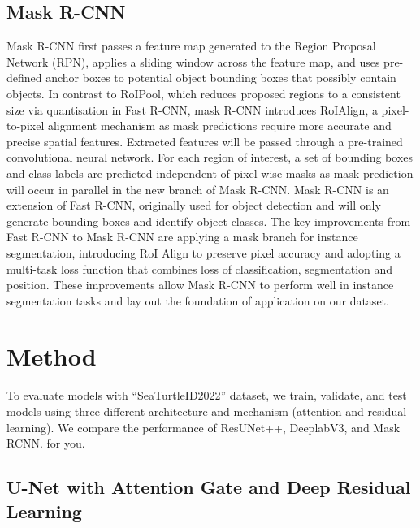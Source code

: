 \documentclass[conference]{IEEEtran}
\begin{document}
\subsection{Mask R-CNN}
Mask R-CNN first passes a feature map generated to the Region Proposal Network (RPN), applies a sliding window across the feature map, and uses pre-defined anchor boxes to potential object bounding boxes that possibly contain objects. In contrast to RoIPool, which reduces proposed regions to a consistent size via quantisation in Fast R-CNN, mask R-CNN introduces RoIAlign, a pixel-to-pixel alignment mechanism as mask predictions require more accurate and precise spatial features. Extracted features will be passed through a pre-trained convolutional neural network. For each region of interest, a set of bounding boxes and class labels are predicted independent of pixel-wise masks as mask prediction will occur in parallel in the new branch of Mask R-CNN. Mask R-CNN is an extension of Fast R-CNN, originally used for object detection and will only generate bounding boxes and identify object classes. The key improvements from Fast R-CNN to Mask R-CNN are applying a mask branch for instance segmentation, introducing RoI Align to preserve pixel accuracy and adopting a multi-task loss function that combines loss of classification, segmentation and position. These improvements allow Mask R-CNN to perform well in instance segmentation tasks and lay out the foundation of application on our dataset.
\section{Method}
To evaluate models with “SeaTurtleID2022” dataset, we train, validate, and test models using three different architecture and mechanism (attention and residual learning). We compare the performance of ResUNet++, DeeplabV3, and Mask RCNN.
for you.
\subsection{U-Net with Attention Gate and Deep Residual Learning}
\end{document}
